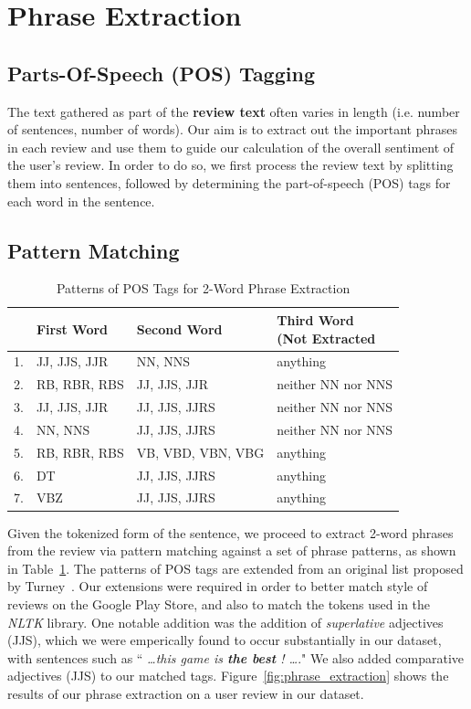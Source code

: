 \documentclass[11pt]{report} %
\begin{document}
\section{Phrase Extraction}
\label{subsection:phrase_extraction}
\subsection{Parts-Of-Speech (POS) Tagging}
The text gathered as part of the \textbf{review text} often varies in length (i.e. number of sentences, number of words). Our aim is to extract out the important phrases in each review and use them to guide our calculation of the overall sentiment of the user's review. In order to do so, we first process the review text by splitting them into sentences, followed by determining the part-of-speech (POS) tags for each word in the sentence. 
\subsection{Pattern Matching}
\begin{table}[h]
	\centering
    \begin{tabular}{  l  l  l  l}
    \hline\hline
    	 & First Word & Second Word & \shortstack{Third Word \\ (Not Extracted} \\ \hline
	1. & JJ, JJS, JJR & NN, NNS & anything \\ \hline
	2. & RB, RBR, RBS &JJ, JJS, JJR & neither NN nor NNS \\ \hline
	3. & JJ, JJS, JJR & JJ, JJS, JJRS & neither NN nor NNS \\ \hline
	4. & NN, NNS & JJ, JJS, JJRS & neither NN nor NNS \\ \hline
	5. & RB, RBR, RBS &VB, VBD, VBN, VBG & anything \\ \hline
	6. & DT & JJ, JJS, JJRS & anything \\ \hline
	7. & VBZ & JJ, JJS, JJRS & anything \\ \hline
    \hline
    \end{tabular}
\caption{Patterns of POS Tags for 2-Word Phrase Extraction}
\label{fig:postags}
\end{table}

Given the tokenized form of the sentence, we proceed to extract 2-word phrases from the review via pattern matching against a set of phrase patterns, as shown in Table~\ref{fig:postags}. The patterns of POS tags are extended from an original list proposed by Turney~\cite{Turney2001}. Our extensions were required in order to better match style of reviews on the Google Play Store, and also to match the tokens used in the \textit{NLTK} library. One notable addition was the addition of \textit{superlative} adjectives (JJS), which we were emperically found to occur substantially in our dataset, with sentences such as `` \textit{\dots this game is \textbf{the best} ! \dots}." We also added comparative adjectives (JJS) to our matched tags. Figure~\ref{fig:phrase_extraction} shows the results of our phrase extraction on a user review in our dataset.
\end{document}
